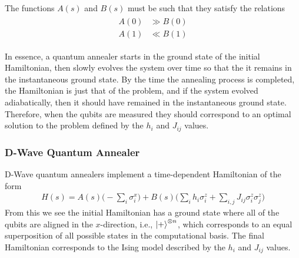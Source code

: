 The functions \( A(s) \) and \( B(s) \) must be such that they satisfy the relations
\begin{align}
\begin{split}
    A(0) &\gg B(0) \\
    A(1) &\ll B(1)
\end{split}
\end{align}

In essence, a quantum annealer starts in the ground state of the initial Hamiltonian, then slowly evolves the system over time so that the it remains in the instantaneous ground state.
By the time the annealing process is completed, the Hamiltonian is just that of the problem, and if the system evolved adiabatically, then it should have remained in the instantaneous ground state.
Therefore, when the qubits are measured they should correspond to an optimal solution to the problem defined by the \( h_i \) and \( J_{ij} \) values.

\subsubsection{D-Wave Quantum Annealer}
D-Wave quantum annealers implement a time-dependent Hamiltonian of the form~\cite{dwave_qa}
\begin{align}
    H(s) = A(s) \bigg( -\sum_i \sigma_i^x \bigg) + B(s) \bigg( \sum_i h_i \sigma_i^z + \sum_{i,j} J_{ij} \sigma_i^z \sigma_j^z \bigg)
\end{align}
From this we see the initial Hamiltonian has a ground state where all of the qubits are aligned in the \( x \)-direction, i.e., \( \ket{+}^{\otimes n} \), which corresponds to an equal superposition of all possible states in the computational basis.
The final Hamiltonian corresponds to the Ising model described by the \( h_i \) and \( J_{ij} \) values.

